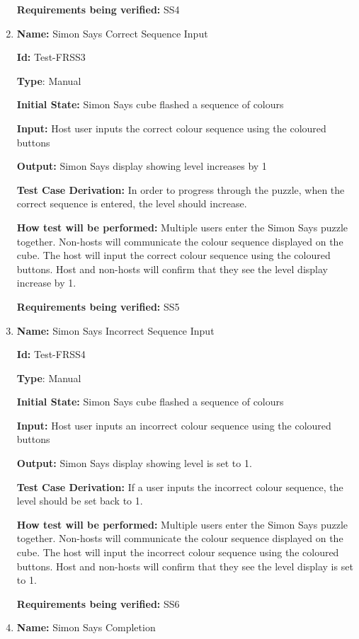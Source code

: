 \documentclass[12pt, titlepage]{article}
\begin{document}
\begin{enumerate}
\textbf{Requirements being verified: } SS4

\item{\textbf{Name:} Simon Says Correct Sequence Input} \label{itm:Test-FRSS3}

\textbf{Id:} Test-FRSS3

\textbf{Type}: Manual

\textbf{Initial State:} Simon Says cube flashed a sequence of colours

\textbf{Input:} Host user inputs the correct colour sequence using the coloured buttons

\textbf{Output:} Simon Says display showing level increases by 1

\textbf{Test Case Derivation:} In order to progress through the puzzle, when the correct sequence is entered, the level should increase.

\textbf{How test will be performed:} Multiple users enter the Simon Says puzzle together. Non-hosts will communicate the colour sequence displayed on the cube. The host will input the correct colour sequence using the coloured buttons. Host and non-hosts will confirm that they see the level display increase by 1.

\textbf{Requirements being verified: } SS5

\item{\textbf{Name:} Simon Says Incorrect Sequence Input} \label{itm:Test-FRSS4}

\textbf{Id:} Test-FRSS4

\textbf{Type}: Manual

\textbf{Initial State:} Simon Says cube flashed a sequence of colours

\textbf{Input:} Host user inputs an incorrect colour sequence using the coloured buttons

\textbf{Output:} Simon Says display showing level is set to 1.

\textbf{Test Case Derivation:} If a user inputs the incorrect colour sequence, the level should be set back to 1.

\textbf{How test will be performed:} Multiple users enter the Simon Says puzzle together. Non-hosts will communicate the colour sequence displayed on the cube. The host will input the incorrect colour sequence using the coloured buttons. Host and non-hosts will confirm that they see the level display is set to 1.

\textbf{Requirements being verified: } SS6

\item{\textbf{Name:} Simon Says Completion} \label{itm:Test-FRSS5}


\end{enumerate}
\end{document}
